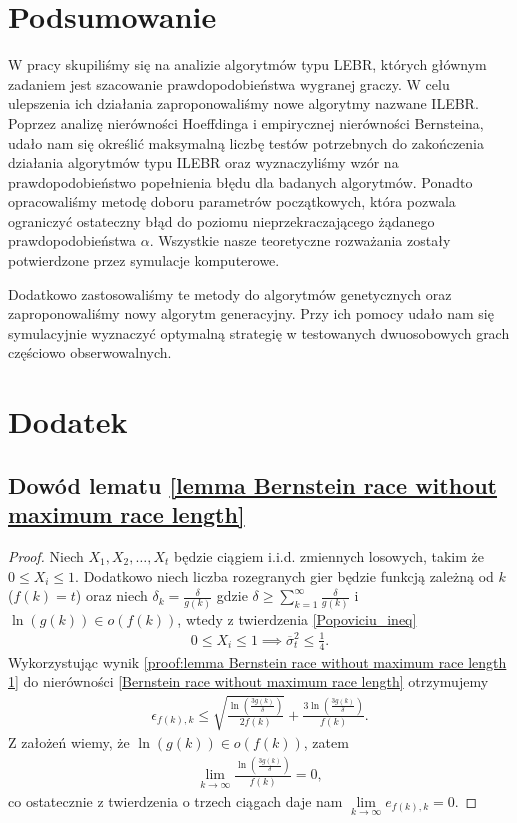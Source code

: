\documentclass[inzynierska]{pwr_wmat_praca_dyplomowa}
\theoremstyle{plain}
\numberwithin{theorem}{chapter}
\theoremstyle{definition}
\numberwithin{theorem}{chapter}
\begin{document}
	
	
{\backmatter \chapter{Podsumowanie}}
W pracy skupiliśmy się na analizie algorytmów typu LEBR, których głównym zadaniem jest szacowanie prawdopodobieństwa wygranej graczy.  W celu ulepszenia ich działania zaproponowaliśmy nowe algorytmy nazwane ILEBR. Poprzez analizę nierówności Hoeffdinga i empirycznej nierówności Bernsteina, udało nam się określić maksymalną liczbę testów potrzebnych do zakończenia działania algorytmów typu ILEBR oraz wyznaczyliśmy wzór na prawdopodobieństwo popełnienia błędu dla badanych algorytmów. Ponadto opracowaliśmy metodę doboru parametrów początkowych, która pozwala ograniczyć ostateczny błąd do poziomu nieprzekraczającego żądanego prawdopodobieństwa $\alpha$. Wszystkie nasze teoretyczne rozważania zostały potwierdzone przez symulacje komputerowe.

Dodatkowo zastosowaliśmy te metody do algorytmów genetycznych oraz zaproponowaliśmy nowy algorytm generacyjny. Przy ich pomocy udało nam się symulacyjnie wyznaczyć optymalną strategię w testowanych dwuosobowych grach częściowo obserwowalnych. 


{\backmatter \chapter{Dodatek}} \label{Dodatek}
\section{Dowód lematu \ref{lemma Bernstein race without maximum race length}}\label{proof:lemma Bernstein race without maximum race length}
\begin{proof}
	Niech $X_1, X_2, \dots, X_t$ będzie ciągiem i.i.d. zmiennych losowych, takim że  $0 \le X_i \le 1$. Dodatkowo niech liczba rozegranych gier będzie funkcją zależną od $k$ ($f(k) = t$) %
	oraz niech $\delta_k = \frac{\delta}{g(k)}$
	gdzie $\delta \ge \sum_{k=1}^{\infty} \frac{\delta}{g(k)}$ i $\ln(g(k)) \in o(f(k))$, wtedy z twierdzenia \ref{Popoviciu_ineq}
	\begin{gather}
		\label{proof:lemma Bernstein race without maximum race length 1}
		0\le X_i \le 1 \implies \overline{\sigma}_t^2 \le \frac{1}{4}.
	\end{gather}
	Wykorzystując wynik \eqref{proof:lemma Bernstein race without maximum race length 1} do nierówności \eqref{Bernstein race without maximum race length} otrzymujemy 
	\begin{gather*}
		\epsilon_{f(k), k} \le  \sqrt{\frac{\ln(\frac{3g(k)}{\delta})}{2f(k)}} + \frac{3  \ln{(\frac{3g(k)}{\delta})}}{f(k)}.
	\end{gather*}
	Z założeń wiemy, że $\ln(g(k)) \in o(f(k))$, zatem
	\begin{gather*}
		\lim\limits_{k\to\infty} \frac{  \ln{(\frac{3g(k)}{\delta})}}{f(k)} = 0,
	\end{gather*}
	co ostatecznie z twierdzenia o trzech ciągach daje nam $ \lim\limits_{k\to\infty}  e_{f(k), k} = 0$.
\end{proof}
\end{document}
